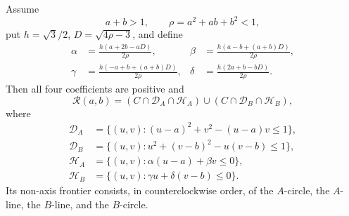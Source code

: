 \begin{theorem}
\label{thm:strict-ab-union}
Assume
\[
 a+b>1,\qquad \rho=a^2+ab+b^2<1,
\]
put $h=\sqrt3/2$, $D=\sqrt{4\rho-3}$, and define
\begin{align*}
 \alpha&=\frac{h(a+2b-aD)}{2\rho},&
 \beta&=\frac{h(a-b+(a+b)D)}{2\rho},\\
 \gamma&=\frac{h(-a+b+(a+b)D)}{2\rho},&
 \delta&=\frac{h(2a+b-bD)}{2\rho}.
\end{align*}
Then all four coefficients are positive and
\begin{equation}
 \mathcal R(a,b)=
 (C\cap\mathcal D_A\cap\mathcal H_A)
 \cup(C\cap\mathcal D_B\cap\mathcal H_B),       \label{eq:strict-ab-identity}
\end{equation}
where
\begin{align*}
 \mathcal D_A&=\{(u,v):(u-a)^2+v^2-(u-a)v\le1\},\\
 \mathcal D_B&=\{(u,v):u^2+(v-b)^2-u(v-b)\le1\},\\
 \mathcal H_A&=\{(u,v):\alpha(u-a)+\beta v\le0\},\\
 \mathcal H_B&=\{(u,v):\gamma u+\delta(v-b)\le0\}.
\end{align*}
Its non-axis frontier consists, in counterclockwise order, of the
$A$-circle, the $A$-line, the $B$-line, and the $B$-circle.
\end{theorem}

